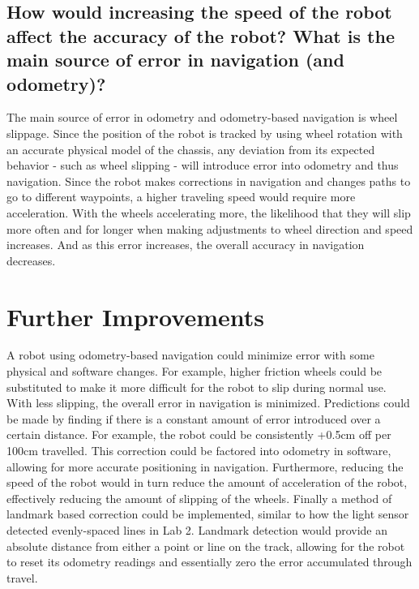 \documentclass[11pt]{article}
\begin{document}

\subsection{How would increasing the speed of the robot affect the accuracy of the robot? What is
the main source of error in navigation (and odometry)?}
The main source of error in odometry and odometry-based navigation is wheel slippage. Since the
position of the robot is tracked by using wheel rotation with an accurate physical model of the
chassis, any deviation from its expected behavior - such as wheel slipping - will introduce error
into odometry and thus navigation. Since the robot makes corrections in navigation and changes paths
to go to different waypoints, a higher traveling speed would require more acceleration. With the
wheels accelerating more, the likelihood that they will slip more often and for longer when making
adjustments to wheel direction and speed increases. And as this error increases, the overall
accuracy in navigation decreases.

\section{Further Improvements}
A robot using odometry-based navigation could minimize error with some physical and software
changes. For example, higher friction wheels could be substituted to make it more difficult for the
robot to slip during normal use. With less slipping, the overall error in navigation is minimized.
Predictions could be made by finding if there is a constant amount of error introduced over a
certain distance. For example, the robot could be consistently +0.5cm off per 100cm travelled. This
correction could be factored into odometry in software, allowing for more accurate positioning in
navigation. Furthermore, reducing the speed of the robot would in turn reduce the amount of
acceleration of the robot, effectively reducing the amount of slipping of the wheels. Finally a
method of landmark based correction could be implemented, similar to how the light
sensor detected evenly-spaced lines in Lab 2. Landmark detection would provide an absolute distance
from either a point or line on the track, allowing for the robot to reset its odometry readings and
essentially zero the error accumulated through travel.
\end{document}
